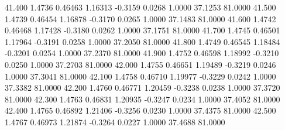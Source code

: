  41.400   1.4736   0.46463   1.16313  -0.3159   0.0268   1.0000  37.1253  81.0000
  41.500   1.4739   0.46454   1.16878  -0.3170   0.0265   1.0000  37.1483  81.0000
  41.600   1.4742   0.46468   1.17428  -0.3180   0.0262   1.0000  37.1751  81.0000
  41.700   1.4745   0.46501   1.17964  -0.3191   0.0258   1.0000  37.2050  81.0000
  41.800   1.4749   0.46545   1.18484  -0.3201   0.0254   1.0000  37.2370  81.0000
  41.900   1.4752   0.46598   1.18992  -0.3210   0.0250   1.0000  37.2703  81.0000
  42.000   1.4755   0.46651   1.19489  -0.3219   0.0246   1.0000  37.3041  81.0000
  42.100   1.4758   0.46710   1.19977  -0.3229   0.0242   1.0000  37.3382  81.0000
  42.200   1.4760   0.46771   1.20459  -0.3238   0.0238   1.0000  37.3720  81.0000
  42.300   1.4763   0.46831   1.20935  -0.3247   0.0234   1.0000  37.4052  81.0000
  42.400   1.4765   0.46892   1.21406  -0.3256   0.0230   1.0000  37.4375  81.0000
  42.500   1.4767   0.46973   1.21874  -0.3264   0.0227   1.0000  37.4688  81.0000
